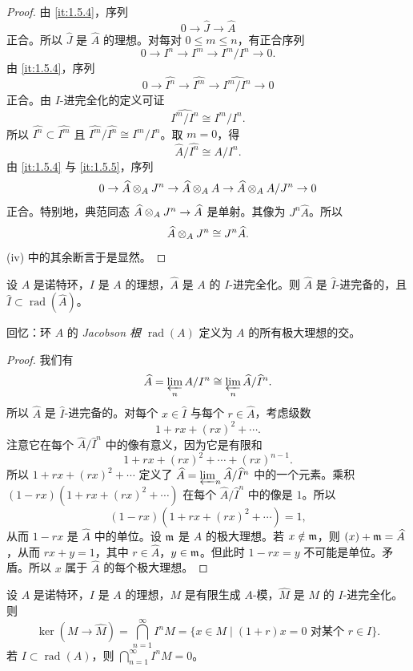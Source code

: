 \begin{proof}
由 \ref{it:1.5.4}，序列
\[
0\to\widehat J\to\widehat A
\]
正合。所以 $\widehat J$ 是 $\widehat A$ 的理想。对每对 $0\le m\le n$，有正合序列
\[
0\to I^n\to I^m\to I^m/I^n\to 0.
\]
由 \ref{it:1.5.4}，序列
\[
0\to\widehat{I^n}\to\widehat{I^m}\to\widehat{I^m/I^n}\to 0
\]
正合。由 $I$-进完全化的定义可证
\[
\widehat{I^m/I^n}\cong I^m/I^n.
\]
所以 $\widehat{I^n}\subset\widehat{I^m}$ 且 $\widehat{I^m}/\widehat{I^n}\cong I^m/I^n$。取 $m=0$，得
\[
\widehat A/\widehat{I^n}\cong A/I^n.
\]
由 \ref{it:1.5.4} 与 \ref{it:1.5.5}，序列
\[
0\to\widehat A\otimes_A J^n\to\widehat A\otimes_A A\to\widehat A\otimes_A A/J^n\to 0
\]
正合。特别地，典范同态 $\widehat A\otimes_A J^n\to\widehat A$ 是单射。其像为 $J^n\widehat A$。所以
\[
\widehat A\otimes_A J^n\cong J^n\widehat A.
\]
(iv) 中的其余断言于是显然。
\end{proof}

\begin{proposition}\label{it:1.5.7}
设 $A$ 是诺特环，$I$ 是 $A$ 的理想，$\widehat A$ 是 $A$ 的 $I$-进完全化。则 $\widehat A$ 是 $\widehat I$-进完备的，且 $\widehat I\subset\operatorname{rad}(\widehat A)$。
\end{proposition}

回忆：环 $A$ 的 \emph{Jacobson 根} $\operatorname{rad}(A)$ 定义为 $A$ 的所有极大理想的交。

\begin{proof}
我们有
\[
\widehat A=\varprojlim_n A/I^n\cong\varprojlim_n\widehat A/\widehat I^n.
\]
所以 $\widehat A$ 是 $\widehat I$-进完备的。对每个 $x\in\widehat I$ 与每个 $r\in\widehat A$，考虑级数
\[
1+rx+(rx)^2+\cdots.
\]
注意它在每个 $\widehat A/\widehat I^n$ 中的像有意义，因为它是有限和
\[
1+rx+(rx)^2+\cdots+(rx)^{n-1}.
\]
所以 $1+rx+(rx)^2+\cdots$ 定义了 $\widehat A=\varprojlim_n\widehat A/\widehat I^n$ 中的一个元素。乘积 $(1-rx)(1+rx+(rx)^2+\cdots)$ 在每个 $\widehat A/\widehat I^n$ 中的像是 $1$。所以
\[
(1-rx)(1+rx+(rx)^2+\cdots)=1,
\]
从而 $1-rx$ 是 $\widehat A$ 中的单位。设 $\mathfrak{m}$ 是 $\widehat A$ 的极大理想。若 $x\notin\mathfrak{m}$，则 $(x)+\mathfrak{m}=\widehat A$，从而 $rx+y=1$，其中 $r\in\widehat A$，$y\in\mathfrak{m}$。但此时 $1-rx=y$ 不可能是单位。矛盾。所以 $x$ 属于 $\widehat A$ 的每个极大理想。
\end{proof}

\begin{proposition}\label{it:1.5.8}
设 $A$ 是诺特环，$I$ 是 $A$ 的理想，$M$ 是有限生成 $A$-模，$\widehat M$ 是 $M$ 的 $I$-进完全化。则
\[
\ker(M\to\widehat M)=\bigcap_{n=1}^{\infty}I^nM=\{x\in M\mid (1+r)x=0 \text{ 对某个 } r\in I\}.
\]
若 $I\subset\operatorname{rad}(A)$，则 $\bigcap_{n=1}^{\infty}I^nM=0$。
\end{proposition}

